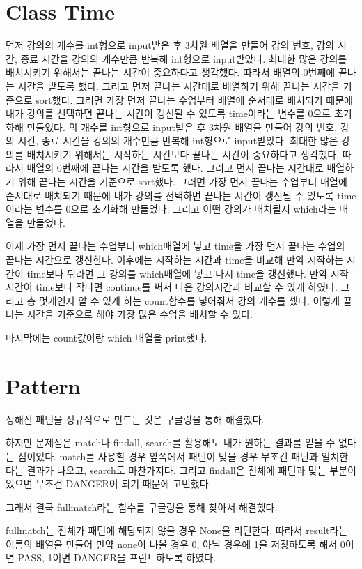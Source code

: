 \documentclass{article}
\begin{document}
\section{Class Time}
먼저 강의의 개수를 int형으로 input받은 후 3차원 배열을 만들어 강의 번호, 강의 시간, 종료 시간을 강의의 개수만큼 반복해 int형으로 input받았다. 최대한 많은 강의를 배치시키기 위해서는 끝나는 시간이 중요하다고 생각했다. 따라서 배열의 0번째에 끝나는 시간을 받도록 했다. 그리고 먼저 끝나는 시간대로 배열하기 위해 끝나는 시간을 기준으로 sort했다. 그러면 가장 먼저 끝나는 수업부터 배열에 순서대로 배치되기 때문에 내가 강의를 선택하면 끝나는 시간이 갱신될 수 있도록 time이라는 변수를 0으로 초기화해 만들었다. 의 개수를 int형으로 input받은 후 3차원 배열을 만들어 강의 번호, 강의 시간, 종료 시간을 강의의 개수만큼 반복해 int형으로 input받았다. 최대한 많은 강의를 배치시키기 위해서는 시작하는 시간보다 끝나는 시간이 중요하다고 생각했다. 따라서 배열의 0번째에 끝나는 시간을 받도록 했다. 그리고 먼저 끝나는 시간대로 배열하기 위해 끝나는 시간을 기준으로 sort했다. 그러면 가장 먼저 끝나는 수업부터 배열에 순서대로 배치되기 때문에 내가 강의를 선택하면 끝나는 시간이 갱신될 수 있도록 time이라는 변수를 0으로 초기화해 만들었다. 그리고 어떤 강의가 배치될지 which라는 배열을 만들었다.

이제 가장 먼저 끝나는 수업부터 which배열에 넣고 time을 가장 먼저 끝나는 수업의 끝나는 시간으로 갱신한다. 이후에는 시작하는 시간과 time을 비교해 만약 시작하는 시간이 time보다 뒤라면 그 강의를 which배열에 넣고 다시 time을 갱신했다. 만약 시작 시간이 time보다 작다면 continue를 써서 다음 강의시간과 비교할 수 있게 하였다. 그리고 총 몇개인지 알 수 있게 하는 count함수를 넣어줘서 강의 개수를 셌다. 이렇게 끝나는 시간을 기준으로 해야 가장 많은 수업을 배치할 수 있다.

마지막에는 count값이랑 which 배열을 print했다.
\section{Pattern}
정해진 패턴을 정규식으로 만드는 것은 구글링을 통해 해결했다.
 
하지만 문제점은 match나 findall, search를 활용해도 내가 원하는 결과를 얻을 수 없다는 점이었다. match를 사용할 경우 앞쪽에서 패턴이 맞을 경우 무조건 패턴과 일치한다는 결과가 나오고, search도 마찬가지다. 그리고 findall은 전체에 패턴과 맞는 부분이 있으면 무조건 DANGER이 되기 때문에 고민했다.
 
그래서 결국 fullmatch라는 함수를 구글링을 통해 찾아서 해결했다.
 
fullmatch는 전체가 패턴에 해당되지 않을 경우 None을 리턴한다. 따라서 result라는 이름의 배열을 만들어 만약 none이 나올 경우 0, 아닐 경우에 1을 저장하도록 해서 0이면 PASS, 1이면 DANGER을 프린트하도록 하였다.
\end{document}
